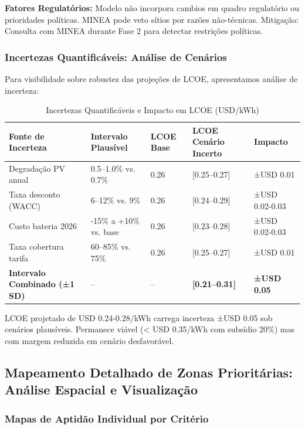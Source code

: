 \documentclass[12pt, a4paper]{article}
\begin{document}
\textbf{Fatores Regulatórios:} Modelo não incorpora cambios em quadro regulatório ou prioridades políticas. MINEA pode veto sítios por razões não-técnicas. Mitigação: Consulta com MINEA durante Fase 2 para detectar restrições políticas.

\subsubsection{Incertezas Quantificáveis: Análise de Cenários}

Para visibilidade sobre robustez das projeções de LCOE, apresentamos análise de incerteza:

\begin{table}[H]
\centering
\caption{Incertezas Quantificáveis e Impacto em LCOE (USD/kWh)}
\label{tab:lcoe_uncertainty}
\footnotesize
\begin{tabular}{|l|l|l|l|l|}
\hline
\textbf{Fonte de Incerteza} & \textbf{Intervalo Plausível} & \textbf{LCOE Base} & \textbf{LCOE Cenário Incerto} & \textbf{Impacto} \\
\hline
Degradação PV anual & 0.5--1.0\% vs. 0.7\% & 0.26 & [0.25--0.27] & ±USD 0.01 \\
\hline
Taxa desconto (WACC) & 6--12\% vs. 9\% & 0.26 & [0.24--0.29] & ±USD 0.02-0.03 \\
\hline
Custo bateria 2026 & -15\% a +10\% vs. base & 0.26 & [0.23--0.28] & ±USD 0.02-0.03 \\
\hline
Taxa cobertura tarifa & 60--85\% vs. 75\% & 0.26 & [0.25--0.27] & ±USD 0.01 \\
\hline
\textbf{Intervalo Combinado (±1 SD)} & -- & -- & \textbf{[0.21--0.31]} & \textbf{±USD 0.05} \\
\hline
\end{tabular}
\end{table}

LCOE projetado de USD 0.24-0.28/kWh carrega incerteza ±USD 0.05 sob cenários plausíveis. Permanece viável (< USD 0.35/kWh com subsídio 20\%) mas com margem reduzida em cenário desfavorável.

\subsection{Mapeamento Detalhado de Zonas Prioritárias: Análise Espacial e Visualização}

\subsubsection{Mapas de Aptidão Individual por Critério}
\end{document}
